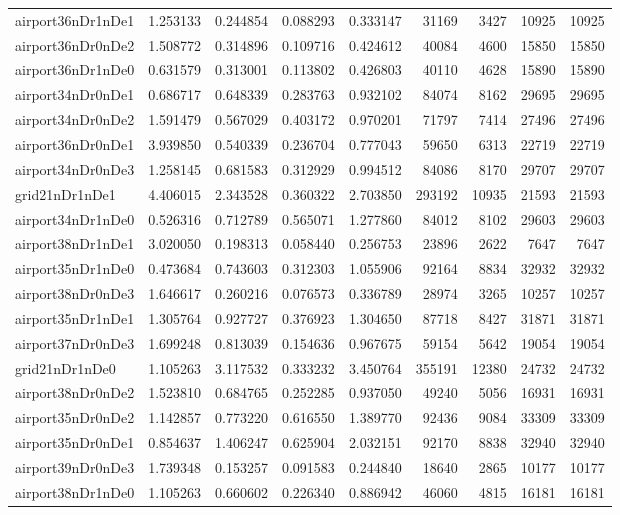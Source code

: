 \begin{longtable}{|l|r|r|r|r|r|r|r|r|}
airport36nDr1nDe1 & 1.253133 & 0.244854 & 0.088293 & 0.333147 & 31169 & 3427 & 10925 & 10925 \\
airport36nDr0nDe2 & 1.508772 & 0.314896 & 0.109716 & 0.424612 & 40084 & 4600 & 15850 & 15850 \\
airport36nDr1nDe0 & 0.631579 & 0.313001 & 0.113802 & 0.426803 & 40110 & 4628 & 15890 & 15890 \\
airport34nDr0nDe1 & 0.686717 & 0.648339 & 0.283763 & 0.932102 & 84074 & 8162 & 29695 & 29695 \\
airport34nDr0nDe2 & 1.591479 & 0.567029 & 0.403172 & 0.970201 & 71797 & 7414 & 27496 & 27496 \\
airport36nDr0nDe1 & 3.939850 & 0.540339 & 0.236704 & 0.777043 & 59650 & 6313 & 22719 & 22719 \\
airport34nDr0nDe3 & 1.258145 & 0.681583 & 0.312929 & 0.994512 & 84086 & 8170 & 29707 & 29707 \\
grid21nDr1nDe1 & 4.406015 & 2.343528 & 0.360322 & 2.703850 & 293192 & 10935 & 21593 & 21593 \\
airport34nDr1nDe0 & 0.526316 & 0.712789 & 0.565071 & 1.277860 & 84012 & 8102 & 29603 & 29603 \\
airport38nDr1nDe1 & 3.020050 & 0.198313 & 0.058440 & 0.256753 & 23896 & 2622 & 7647 & 7647 \\
airport35nDr1nDe0 & 0.473684 & 0.743603 & 0.312303 & 1.055906 & 92164 & 8834 & 32932 & 32932 \\
airport38nDr0nDe3 & 1.646617 & 0.260216 & 0.076573 & 0.336789 & 28974 & 3265 & 10257 & 10257 \\
airport35nDr1nDe1 & 1.305764 & 0.927727 & 0.376923 & 1.304650 & 87718 & 8427 & 31871 & 31871 \\
airport37nDr0nDe3 & 1.699248 & 0.813039 & 0.154636 & 0.967675 & 59154 & 5642 & 19054 & 19054 \\
grid21nDr1nDe0 & 1.105263 & 3.117532 & 0.333232 & 3.450764 & 355191 & 12380 & 24732 & 24732 \\
airport38nDr0nDe2 & 1.523810 & 0.684765 & 0.252285 & 0.937050 & 49240 & 5056 & 16931 & 16931 \\
airport35nDr0nDe2 & 1.142857 & 0.773220 & 0.616550 & 1.389770 & 92436 & 9084 & 33309 & 33309 \\
airport35nDr0nDe1 & 0.854637 & 1.406247 & 0.625904 & 2.032151 & 92170 & 8838 & 32940 & 32940 \\
airport39nDr0nDe3 & 1.739348 & 0.153257 & 0.091583 & 0.244840 & 18640 & 2865 & 10177 & 10177 \\
airport38nDr1nDe0 & 1.105263 & 0.660602 & 0.226340 & 0.886942 & 46060 & 4815 & 16181 & 16181 \\

\end{longtable}
